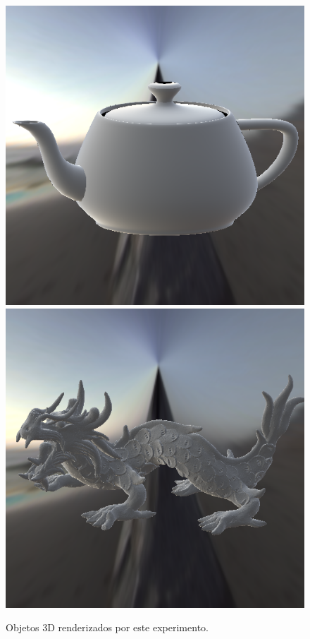 \begin{figure}[H]
    \caption{\small{Objetos 3D renderizados por este experimento.}}
    \label{fig-duer-eqlang}
  \includegraphics[width=\linewidth]{./Imagens/brdfs/duer-teapot.png}
\endminipage\hfill
{}
  \includegraphics[width=\linewidth]{./Imagens/brdfs/duer-dragon.png}

\end{figure}
